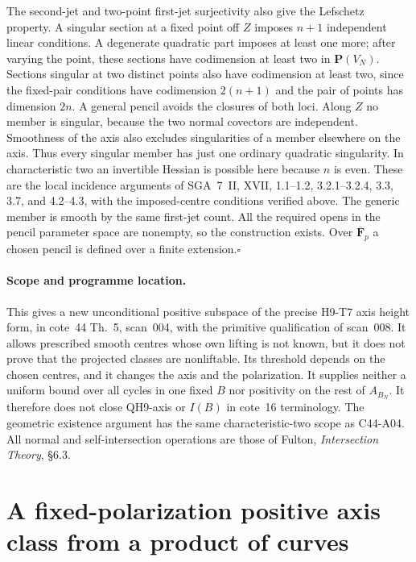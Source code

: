 \documentclass[11pt]{article}
\theoremstyle{remark}\newtheorem{remark}[theorem]{Remark}
\begin{document}
The second-jet and two-point first-jet surjectivity also give the
Lefschetz property. A singular section at a fixed point off $Z$
imposes $n+1$ independent linear conditions. A degenerate
quadratic part imposes at least one more; after varying the point,
these sections have codimension at least two in $\mathbf P(V_N)$.
Sections singular at two distinct points also have codimension at
least two, since the fixed-pair conditions have codimension
$2(n+1)$ and the pair of points has dimension $2n$.
A general pencil avoids the closures of both loci. Along $Z$ no
member is singular, because the two normal covectors are
independent. Smoothness of the axis also excludes singularities
of a member elsewhere on the axis. Thus every singular member
has just one ordinary quadratic singularity. In characteristic
two an invertible Hessian is possible here because $n$ is even.
These are the local incidence arguments of SGA~7~II, XVII,
1.1--1.2, 3.2.1--3.2.4, 3.3, 3.7, and 4.2--4.3, with the
imposed-centre conditions verified above. The generic member is
smooth by the same first-jet count. All the required opens in the
pencil parameter space are nonempty, so the construction exists.
Over $\overline{\mathbf F}_p$ a chosen pencil is defined over a
finite extension.\hfill$\square$

\paragraph{Scope and programme location.}
This gives a new unconditional positive subspace of the precise
H9-T7 axis height form, in cote~44 Th.~5, scan~004, with the
primitive qualification of scan~008. It allows prescribed smooth
centres whose own lifting is not known, but it does not prove that
the projected classes are nonliftable. Its threshold depends on
the chosen centres, and it changes the axis and the polarization.
It supplies neither a uniform bound over all cycles in one fixed
$B$ nor positivity on the rest of $A_{B_N}$. It therefore does not
close QH9-axis or $I(B)$ in cote~16 terminology. The geometric
existence argument has the same characteristic-two scope as
C44-A04. All normal and self-intersection operations are those of
Fulton, \emph{Intersection Theory}, \S6.3.


\section{A fixed-polarization positive axis class from a product of curves}
\end{document}
